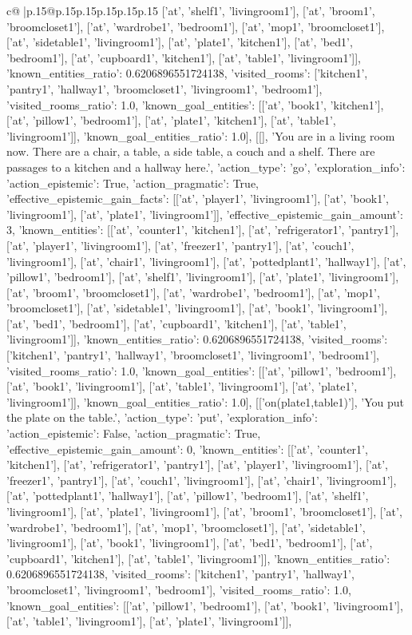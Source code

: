 \documentclass{article}
\begin{document}
{\begin{supertabular}{c@{$\;$}|p{.15\linewidth}@{}p{.15\linewidth}p{.15\linewidth}p{.15\linewidth}p{.15\linewidth}p{.15\linewidth}}
{{{['at', 'shelf1', 'livingroom1'], ['at', 'broom1', 'broomcloset1'], ['at', 'wardrobe1', 'bedroom1'], ['at', 'mop1', 'broomcloset1'], ['at', 'sidetable1', 'livingroom1'], ['at', 'plate1', 'kitchen1'], ['at', 'bed1', 'bedroom1'], ['at', 'cupboard1', 'kitchen1'], ['at', 'table1', 'livingroom1']], 'known_entities_ratio': 0.6206896551724138, 'visited_rooms': ['kitchen1', 'pantry1', 'hallway1', 'broomcloset1', 'livingroom1', 'bedroom1'], 'visited_rooms_ratio': 1.0, 'known_goal_entities': [['at', 'book1', 'kitchen1'], ['at', 'pillow1', 'bedroom1'], ['at', 'plate1', 'kitchen1'], ['at', 'table1', 'livingroom1']], 'known_goal_entities_ratio': 1.0}}], [[], 'You are in a living room now. There are a chair, a table, a side table, a couch and a shelf. There are passages to a kitchen and a hallway here.', {'action_type': 'go', 'exploration_info': {'action_epistemic': True, 'action_pragmatic': True, 'effective_epistemic_gain_facts': [['at', 'player1', 'livingroom1'], ['at', 'book1', 'livingroom1'], ['at', 'plate1', 'livingroom1']], 'effective_epistemic_gain_amount': 3, 'known_entities': [['at', 'counter1', 'kitchen1'], ['at', 'refrigerator1', 'pantry1'], ['at', 'player1', 'livingroom1'], ['at', 'freezer1', 'pantry1'], ['at', 'couch1', 'livingroom1'], ['at', 'chair1', 'livingroom1'], ['at', 'pottedplant1', 'hallway1'], ['at', 'pillow1', 'bedroom1'], ['at', 'shelf1', 'livingroom1'], ['at', 'plate1', 'livingroom1'], ['at', 'broom1', 'broomcloset1'], ['at', 'wardrobe1', 'bedroom1'], ['at', 'mop1', 'broomcloset1'], ['at', 'sidetable1', 'livingroom1'], ['at', 'book1', 'livingroom1'], ['at', 'bed1', 'bedroom1'], ['at', 'cupboard1', 'kitchen1'], ['at', 'table1', 'livingroom1']], 'known_entities_ratio': 0.6206896551724138, 'visited_rooms': ['kitchen1', 'pantry1', 'hallway1', 'broomcloset1', 'livingroom1', 'bedroom1'], 'visited_rooms_ratio': 1.0, 'known_goal_entities': [['at', 'pillow1', 'bedroom1'], ['at', 'book1', 'livingroom1'], ['at', 'table1', 'livingroom1'], ['at', 'plate1', 'livingroom1']], 'known_goal_entities_ratio': 1.0}}], [['on(plate1,table1)'], 'You put the plate on the table.', {'action_type': 'put', 'exploration_info': {'action_epistemic': False, 'action_pragmatic': True, 'effective_epistemic_gain_amount': 0, 'known_entities': [['at', 'counter1', 'kitchen1'], ['at', 'refrigerator1', 'pantry1'], ['at', 'player1', 'livingroom1'], ['at', 'freezer1', 'pantry1'], ['at', 'couch1', 'livingroom1'], ['at', 'chair1', 'livingroom1'], ['at', 'pottedplant1', 'hallway1'], ['at', 'pillow1', 'bedroom1'], ['at', 'shelf1', 'livingroom1'], ['at', 'plate1', 'livingroom1'], ['at', 'broom1', 'broomcloset1'], ['at', 'wardrobe1', 'bedroom1'], ['at', 'mop1', 'broomcloset1'], ['at', 'sidetable1', 'livingroom1'], ['at', 'book1', 'livingroom1'], ['at', 'bed1', 'bedroom1'], ['at', 'cupboard1', 'kitchen1'], ['at', 'table1', 'livingroom1']], 'known_entities_ratio': 0.6206896551724138, 'visited_rooms': ['kitchen1', 'pantry1', 'hallway1', 'broomcloset1', 'livingroom1', 'bedroom1'], 'visited_rooms_ratio': 1.0, 'known_goal_entities': [['at', 'pillow1', 'bedroom1'], ['at', 'book1', 'livingroom1'], ['at', 'table1', 'livingroom1'], ['at', 'plate1', 'livingroom1']], }}}
\end{supertabular}}
\end{document}
